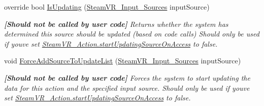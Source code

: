 \begin{DoxyCompactItemize}
override bool \mbox{\hyperlink{class_valve_1_1_v_r_1_1_steam_v_r___action___in_a648d3f94c79e2ec43ec9846535fbf8ef}{Is\+Updating}} (\mbox{\hyperlink{namespace_valve_1_1_v_r_a82e5bf501cc3aa155444ee3f0662853f}{Steam\+V\+R\+\_\+\+Input\+\_\+\+Sources}} input\+Source)
\begin{DoxyCompactList}\small\item\em {\bfseries{\mbox{[}Should not be called by user code\mbox{]}}} Returns whether the system has determined this source should be updated (based on code calls) Should only be used if you\textquotesingle{}ve set \mbox{\hyperlink{class_valve_1_1_v_r_1_1_steam_v_r___action_ae27e9858dec18a4307cca7779ed87ad8}{Steam\+V\+R\+\_\+\+Action.\+start\+Updating\+Source\+On\+Access}} to false. \end{DoxyCompactList}\item 
void \mbox{\hyperlink{class_valve_1_1_v_r_1_1_steam_v_r___action___in_af39cd279bc56854ce6cf89402e405a1c}{Force\+Add\+Source\+To\+Update\+List}} (\mbox{\hyperlink{namespace_valve_1_1_v_r_a82e5bf501cc3aa155444ee3f0662853f}{Steam\+V\+R\+\_\+\+Input\+\_\+\+Sources}} input\+Source)
\begin{DoxyCompactList}\small\item\em {\bfseries{\mbox{[}Should not be called by user code\mbox{]}}} Forces the system to start updating the data for this action and the specified input source. Should only be used if you\textquotesingle{}ve set \mbox{\hyperlink{class_valve_1_1_v_r_1_1_steam_v_r___action_ae27e9858dec18a4307cca7779ed87ad8}{Steam\+V\+R\+\_\+\+Action.\+start\+Updating\+Source\+On\+Access}} to false. \end{DoxyCompactList}\end{DoxyCompactItemize}
